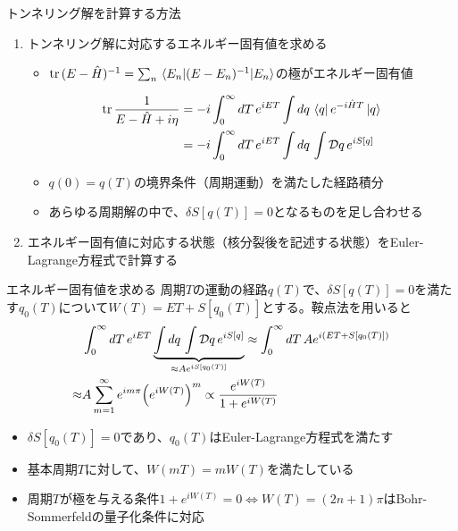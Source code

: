 \documentclass[14pt,aspectratio=169,xcolor=dvipsnames,table,dvipdfmx]{beamer}
\theoremstyle{definition}
\begin{document}
\begin{frame}{トンネリング解を計算する方法}
  \begin{enumerate}
    \item トンネリング解に対応するエネルギー固有値を求める
          \begin{itemize}
            \item $\trace{(E-\hat{H})^{-1}}=\sum_{n}\ev{(E-E_n)^{-1}}{E_n}$の極がエネルギー固有値
          \end{itemize}
          \begin{align*}
            \trace\frac{1}{E-\hat{H}+i\eta} & =-i\int_0^{\infty}dT\,e^{iET}\int dq\,\bra{q}e^{-i\hat{H}T}\ket{q} \\
                                            & = -i\int_0^{\infty}dT\,e^{iET}\int dq\,\int\mathcal{D}q\,e^{iS[q]}
          \end{align*}
          \begin{itemize}
            \item $q(0)=q(T)$の境界条件（周期運動）を満たした経路積分
            \item あらゆる周期解の中で、$\delta S[q(T)]=0$となるものを足し合わせる
          \end{itemize}
  \end{enumerate}
  \begin{enumerate}
    \setcounter{enumi}{1}
    \item エネルギー固有値に対応する状態（核分裂後を記述する状態）をEuler-Lagrange方程式で計算する
  \end{enumerate}
\end{frame}

\begin{frame}{エネルギー固有値を求める}
  周期$T$の運動の経路$q(T)$で、$\delta S[q(T)]=0$を満たす$q_0(T)$について$W(T)=ET+S[q_0(T)]$とする。鞍点法を用いると
  \begin{align*}
            & \int_0^{\infty}dT\,e^{iET}\underbrace{\int dq\,\int\mathcal{D}q\,e^{iS[q]}}_{\approx Ae^{iS[q_0(T)]}}
    \approx\int_0^{\infty}dT\,Ae^{i\qty(ET + S[q_0(T)])}                                                            \\
    \approx & A\sum_{m=1}^{\infty}e^{im\pi}\qty(e^{iW(T)})^m \propto \frac{e^{iW(T)}}{1+e^{iW(T)}}
  \end{align*}
  \begin{itemize}
    \item $\delta S[q_0(T)]=0$であり、$q_0(T)$はEuler-Lagrange方程式を満たす
    \item 基本周期$T$に対して、$W(mT)=mW(T)$を満たしている
    \item 周期$T$が極を与える条件$1+e^{iW(T)}=0\Leftrightarrow W(T)=(2n+1)\pi$はBohr-Sommerfeldの量子化条件に対応
  \end{itemize}
\end{frame}
\end{document}
